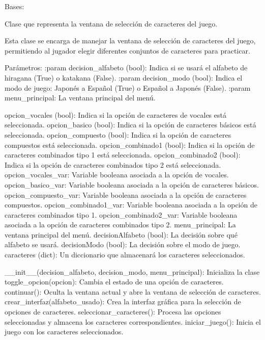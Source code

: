 \documentclass[letterpaper,10pt,spanish]{sphinxmanual}
\begin{document}
\begin{fulllineitems}
\label{\detokenize{menu_juego:menu_juego.CaracteresSelector}}
\pysigstartsignatures
{}
\pysigstopsignatures
\sphinxAtStartPar
Bases: 

\sphinxAtStartPar
Clase que representa la ventana de selección de caracteres del juego.

\sphinxAtStartPar
Esta clase se encarga de manejar la ventana de selección de caracteres del juego, permitiendo al jugador
elegir diferentes conjuntos de caracteres para practicar.

\sphinxAtStartPar
Parámetros:
:param decision\_alfabeto (bool): Indica si se usará el alfabeto de hiragana (True) o katakana (False).
:param decision\_modo (bool): Indica el modo de juego: Japonés a Español (True) o Español a Japonés (False).
:param menu\_principal: La ventana principal del menú.
\begin{description}
\sphinxAtStartPar
opcion\_vocales (bool): Indica si la opción de caracteres de vocales está seleccionada.
opcion\_basico (bool): Indica si la opción de caracteres básicos está seleccionada.
opcion\_compuesto (bool): Indica si la opción de caracteres compuestos está seleccionada.
opcion\_combinado1 (bool): Indica si la opción de caracteres combinados tipo 1 está seleccionada.
opcion\_combinado2 (bool): Indica si la opción de caracteres combinados tipo 2 está seleccionada.
opcion\_vocales\_var: Variable booleana asociada a la opción de vocales.
opcion\_basico\_var: Variable booleana asociada a la opción de caracteres básicos.
opcion\_compuesto\_var: Variable booleana asociada a la opción de caracteres compuestos.
opcion\_combinado1\_var: Variable booleana asociada a la opción de caracteres combinados tipo 1.
opcion\_combinado2\_var: Variable booleana asociada a la opción de caracteres combinados tipo 2.
menu\_principal: La ventana principal del menú.
decisionAlfabeto (bool): La decisión sobre qué alfabeto se usará.
decisionModo (bool): La decisión sobre el modo de juego.
caracteres (dict): Un diccionario que almacenará los caracteres seleccionados.

\sphinxAtStartPar
\_\_init\_\_(decision\_alfabeto, decision\_modo, menu\_principal): Inicializa la clase
toggle\_opcion(opcion): Cambia el estado de una opción de caracteres.
continuar(): Oculta la ventana actual y abre la ventana de selección de caracteres.
crear\_interfaz(alfabeto\_usado): Crea la interfaz gráfica para la selección de opciones de caracteres.
seleccionar\_caracteres(): Procesa las opciones seleccionadas y almacena los caracteres correspondientes.
iniciar\_juego(): Inicia el juego con los caracteres seleccionados.


\end{description}
\end{fulllineitems}
\end{document}

